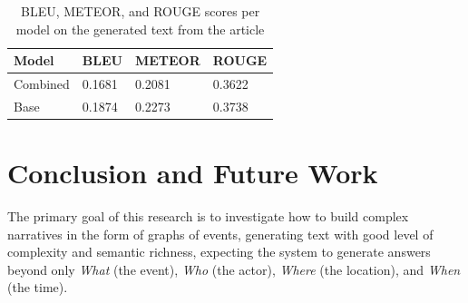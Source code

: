 \documentclass[
hf, %
]{ceurart}
\begin{document}
\begin{table}[]
\caption{BLEU, METEOR, and ROUGE scores per model on the generated text from the article}
\centering
\begin{tabular}{|l|l|l|l|}
\hline
\textbf{Model} & \textbf{BLEU} & \textbf{METEOR} & \textbf{ROUGE} \\ \hline
Combined       & 0.1681        & 0.2081          & 0.3622         \\ \hline
Base           & 0.1874        & 0.2273          & 0.3738         \\ \hline
\end{tabular}

\label{tab:article_auto_metrics}
\end{table}

\section{Conclusion and Future Work}
\label{sec:conclusion}
The primary goal of this research is to investigate how to build complex narratives in the form of graphs of events, generating text with good level of complexity and semantic richness, expecting the system to generate answers beyond only  
 \textit{What} (the event), \textit{Who} (the actor), \textit{Where} (the location), and \textit{When} (the time).
\end{document}
